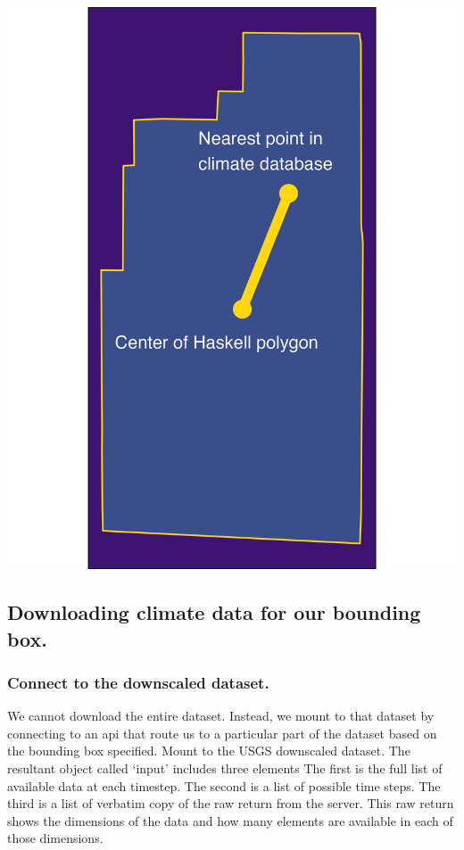 \documentclass[
  paper=a4,
  ,captions=tableheading
]{scrartcl}
\begin{document}
\includegraphics{grid_match.png}

\hypertarget{downloading-climate-data-for-our-bounding-box.}{%
\subsection{Downloading climate data for our bounding
box.}\label{downloading-climate-data-for-our-bounding-box.}}

\hypertarget{connect-to-the-downscaled-dataset.}{%
\subsubsection{Connect to the downscaled
dataset.}\label{connect-to-the-downscaled-dataset.}}

We cannot download the entire dataset. Instead, we mount to that dataset
by connecting to an api that route us to a particular part of the
dataset based on the bounding box specified. Mount to the USGS
downscaled dataset. The resultant object called `input' includes three
elements The first is the full list of available data at each timestep.
The second is a list of possible time steps. The third is a list of
verbatim copy of the raw return from the server. This raw return shows
the dimensions of the data and how many elements are available in each
of those dimensions.
\end{document}
